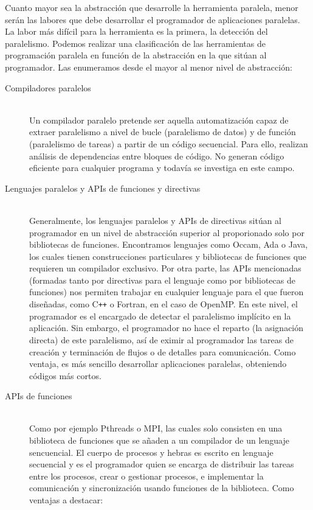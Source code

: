 Cuanto mayor sea la abstracción que desarrolle la herramienta paralela, menor serán las labores que debe desarrollar el programador de aplicaciones paralelas. La labor más difícil para la herramienta es la primera, la detección del paralelismo. Podemos realizar una clasificación de las herramientas de programación paralela en función de la abstracción en la que sitúan al programador. Las enumeramos desde el mayor al menor nivel de abstracción:
\begin{description}
    \item [Compiladores paralelos]~\\
        Un compilador paralelo pretende ser aquella automatización capaz de extraer paralelismo a nivel de bucle (paralelismo de datos) y de función (paralelismo de tareas) a partir de un código secuencial. Para ello, realizan análisis de dependencias entre bloques de código. No generan código eficiente para cualquier programa y todavía se investiga en este campo.
    \item [Lenguajes paralelos y APIs de funciones y directivas]~\\
        Generalmente, los lenguajes paralelos y APIs de directivas sitúan al programador en un nivel de abstracción superior al proporionado solo por bibliotecas de funciones. Encontramos lenguajes como Occam, Ada o Java, los cuales tienen construcciones particulares y bibliotecas de funciones que requieren un compilador exclusivo. Por otra parte, las APIs mencionadas (formadas tanto por directivas para el lenguaje como por bibliotecas de funciones) nos permiten trabajar en cualquier lenguaje para el que fueron diseñadas, como C\verb|++| o Fortran, en el caso de OpenMP\@. En este nivel, el programador es el encargado de detectar el paralelismo implícito en la aplicación. Sin embargo, el programador no hace el reparto (la asignación directa) de este paralelismo, así de eximir al programador las tareas de creación y terminación de flujos o de detalles para comunicación. Como ventaja, es más sencillo desarrollar aplicaciones paralelas, obteniendo códigos más cortos.
    \item [APIs de funciones]~\\
        Como por ejemplo Pthreads o MPI, las cuales solo consisten en una biblioteca de funciones que se añaden a un compilador de un lenguaje sencuencial. El cuerpo de procesos y hebras es escrito en lenguaje secuencial y es el programador quien se encarga de distribuir las tareas entre los procesos, crear o gestionar procesos, e implementar la comunicación y sincronización usando funciones de la biblioteca. Como ventajas a destacar:

\end{description}
